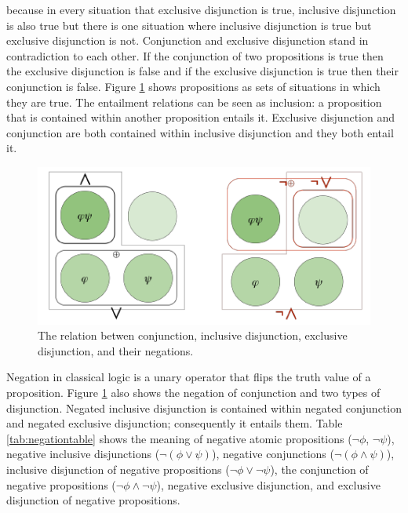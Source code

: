\documentclass[oneside]{report}
\theoremstyle{definition}
\theoremstyle{definition}
\theoremstyle{definition}
\theoremstyle{remark}
\begin{document}
because in every situation that exclusive disjunction is true, inclusive
disjunction is also true but there is one situation where inclusive
disjunction is true but exclusive disjunction is not. Conjunction and
exclusive disjunction stand in contradiction to each other. If the
conjunction of two propositions is true then the exclusive disjunction
is false and if the exclusive disjunction is true then their conjunction
is false. Figure \ref{fig:entailmentFigure} shows propositions as sets
of situations in which they are true. The entailment relations can be
seen as inclusion: a proposition that is contained within another
proposition entails it. Exclusive disjunction and conjunction are both
contained within inclusive disjunction and they both entail it.
\begin{figure}[tb]

{\centering \includegraphics{figs/entailmentFigure-1} 

}

\caption{The relation betwen conjunction, inclusive disjunction, exclusive disjunction, and their negations.}\label{fig:entailmentFigure}
\end{figure}
Negation in classical logic is a unary operator that flips the truth
value of a proposition. Figure \ref{fig:entailmentFigure} also shows the
negation of conjunction and two types of disjunction. Negated inclusive
disjunction is contained within negated conjunction and negated
exclusive disjunction; consequently it entails them. Table
\ref{tab:negationtable} shows the meaning of negative atomic
propositions (\(\lnot \phi\), \(\lnot \psi\)), negative inclusive
disjunctions (\(\lnot (\phi \lor \psi)\)), negative conjunctions
(\(\lnot (\phi \land \psi)\)), inclusive disjunction of negative
propositions (\(\lnot \phi \lor \lnot \psi\)), the conjunction of
negative propositions (\(\lnot \phi \land \lnot \psi\)), negative
exclusive disjunction, and exclusive disjunction of negative
propositions.
\end{document}
